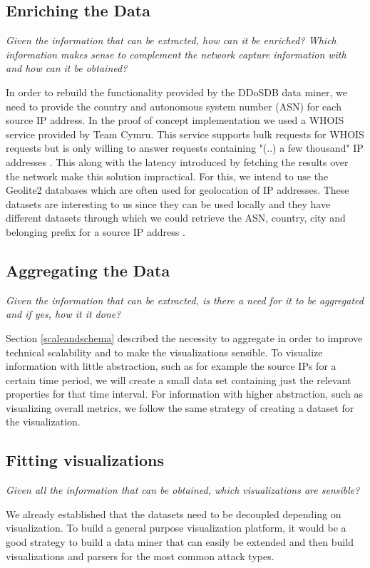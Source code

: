     \subsection{Enriching the Data}
\label{enrichingthedata}    \textit{Given the information that can be extracted, how can it be enriched? Which information makes sense to complement the network capture information with and how can it be obtained?}
    
In order to rebuild the functionality provided by the DDoSDB data miner, we need to provide the country and autonomous system number (ASN) for each source IP address.
In the proof of concept implementation we used a WHOIS service provided by Team Cymru. This service supports bulk requests for WHOIS requests but is only willing to answer requests containing "(..) a few thousand" IP addresses \cite{teamcymru}. This along with the latency introduced by fetching the results over the network make this solution impractical. For this, we intend to use the Geolite2 databases which are often used for geolocation of IP addresses. These datasets are interesting to us since they can be used locally and they have different datasets through which we could retrieve the ASN, country, city and belonging prefix for a source IP address \cite{geolite2}.

    
    \subsection{Aggregating the Data} 
\textit{Given the information that can be extracted, is there a need for it to be aggregated and if yes, how it it done? 
}    

Section \ref{scaleandschema} described the necessity to aggregate in order to improve technical scalability and to make the visualizations sensible.
To visualize information with little abstraction, such as for example the source IPs for a certain time period, we will create a small data set containing just the relevant properties for that time interval.
For information with higher abstraction, such as visualizing overall metrics, we follow the same strategy of creating a dataset for the visualization.
    \subsection{Fitting visualizations}
\textit{Given all the information that can be obtained, which visualizations are sensible?
}

We already established that the datasets need to be decoupled depending on visualization. To build a general purpose visualization platform, it would be a good strategy to build a data miner that can easily be extended and then build visualizations and parsers for the most common attack types.
